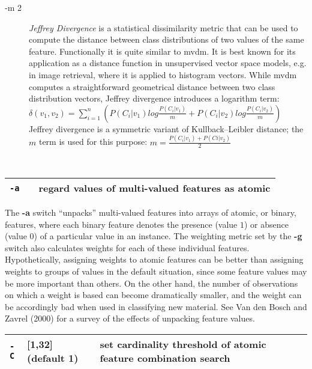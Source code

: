 \documentclass[11pt]{article}
\begin{document}
\begin{description}
\item[-m 2] {\em Jeffrey Divergence} is a statistical dissimilarity
  metric that can be used to compute the distance between class
  distributions of two values of the same feature. Functionally it is
  quite similar to {\sc mvdm}. It is best known for its application as
  a distance function in unsupervised vector space models, e.g. in
  image retrieval, where it is applied to histogram vectors. While
  {\sc mvdm} computes a straightforward geometrical distance between
  two class distribution vectors, Jeffrey divergence introduces a
  logarithm term:
\begin{math}
\delta(v_{1}, v_{2}) = \sum_{i=1}^{n} 
( P(C_{i}|v_{1}) log \frac{P(C_{i}|v_{1})}{m} +
  P(C_{i}|v_{2}) log \frac{P(C_{i}|v_{2})}{m} )
\label{jd}
\end{math}
Jeffrey divergence is a symmetric variant of Kullback--Leibler
distance; the $m$ term is used for this purpose:
\begin{math}
m = \frac{P(C_{i}|v_{1}) + P(C{i}|v_{2})}{2}
\label{jdm}
\end{math}
\end{description}
\ \\

\begin{tabular}{|p{}|p{}|p{}|}
\hline
{\tt -a} & & regard values of multi-valued features as atomic \\
\hline
\end{tabular}

The {\bf -a} switch ``unpacks'' multi-valued features into arrays of
atomic, or binary, features, where each binary feature denotes the
presence (value $1$) or absence (value $0$) of a particular value in
an instance. The weighting metric set by the {\bf -g} switch also
calculates weights for each of these individual
features. Hypothetically, assigning weights to atomic features can be
better than assigning weights to groups of values in the default
situation, since some feature values may be more important than
others. On the other hand, the number of observations on which a
weight is based can become dramatically smaller, and the weight can be
accordingly bad when used in classifying new material. See Van den
Bosch and Zavrel (2000) for a survey of the effects of unpacking
feature values.  \ \\

\begin{tabular}{|p{}|p{}|p{}|}
\hline
{\tt -C} & [1,32] (default 1) & set cardinality threshold of atomic feature combination search  \\
\hline
\end{tabular}
\end{document}
